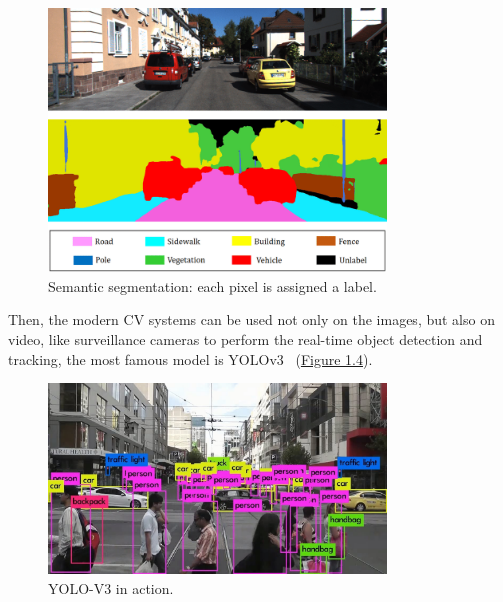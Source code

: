 \begin{figure}[H]
    \centering
    \includegraphics[width=0.8\textwidth]{images/1_1_semantic_segmentation}
    \caption{Semantic segmentation: each pixel is assigned a label.}
    \label{fig:figure-semantic-segmentation}
\end{figure}

Then, the modern CV systems can be used not only on the images, but also on video, like surveillance cameras to perform the real-time object detection and tracking, the most famous model is YOLOv3~\cite{yolov3_paper} (\hyperref[fig:figure-yolo-v3]{Figure 1.4}).

\begin{figure}[H]
    \centering
    \includegraphics[width=0.8\textwidth]{images/1_1_yolov3}
    \caption{YOLO-V3 in action.}
    \label{fig:figure-yolo-v3}
\end{figure}

